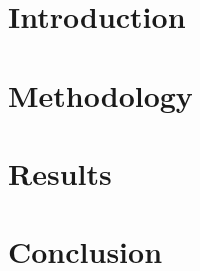 \documentclass{article}
\begin{document}
\tableofcontents

\section{Introduction}
\section{Methodology}
\section{Results}
\section{Conclusion}
\end{document}
